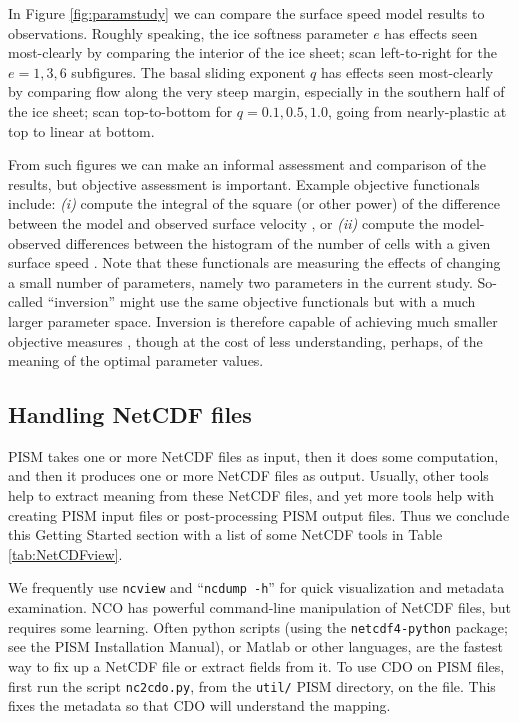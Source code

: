 In Figure \ref{fig:paramstudy} we can compare the surface speed model results to observations.  Roughly speaking, the ice softness parameter $e$ has effects seen most-clearly by comparing the interior of the ice sheet; scan left-to-right for the $e=1,3,6$ subfigures.  The basal sliding exponent $q$ has effects seen most-clearly by comparing flow along the very steep margin, especially in the southern half of the ice sheet; scan top-to-bottom for $q=0.1,0.5,1.0$, going from nearly-plastic at top to linear at bottom.

From such figures we can make an informal assessment and comparison of the results, but objective assessment is important.  Example objective functionals include: \emph{(i)} compute the integral of the square (or other power) of the difference between the model and observed surface velocity \cite{AschwandenAdalgeirsdottirKhroulev}, or \emph{(ii)} compute the model-observed differences between the histogram of the number of cells with a given surface speed \cite{BKAJS}.  Note that these functionals are measuring the effects of changing a small number of parameters, namely two parameters in the current study.  So-called ``inversion'' might use the same objective functionals but with a much larger parameter space.  Inversion is therefore capable of achieving much smaller objective measures \cite{Habermannetal2013,Larouretal2012,Priceetal2011}, though at the cost of less understanding, perhaps, of the meaning of the optimal parameter values.

\clearpage  %

\subsection{Handling NetCDF files}\label{subsect:nctoolsintro}  PISM takes one or more NetCDF files as input, then it does some computation, and then it produces one or more NetCDF files as output.  Usually, other tools help to extract meaning from these NetCDF files, and yet more tools help with creating PISM input files or post-processing PISM output files.  Thus we conclude this Getting Started section with a list of some NetCDF tools in Table \ref{tab:NetCDFview}.

We frequently use \texttt{ncview} and ``\texttt{ncdump -h}'' for quick visualization and metadata examination.  NCO has powerful command-line manipulation of NetCDF files, but requires some learning.  Often python scripts (using the \texttt{netcdf4-python} package; see the PISM Installation Manual), or Matlab or other languages, are the fastest way to fix up a NetCDF file or extract fields from it.  To use CDO on PISM files, first run the script \texttt{nc2cdo.py}, from the \texttt{util/} PISM directory, on the file.  This fixes the metadata so that CDO will understand the mapping.

